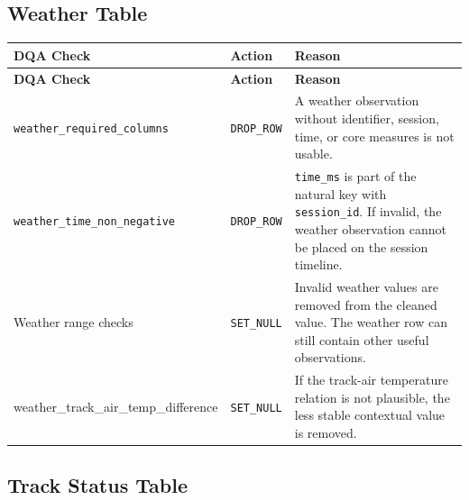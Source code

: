 \documentclass[a4paper,11pt]{article}
\begin{document}
	\subsection{Weather Table}
	
	\begin{longtable}{p{6cm}p{2.5cm}p{6.4cm}}
		\toprule
		\textbf{DQA Check} & \textbf{Action} & \textbf{Reason} \\
		\midrule
		\endfirsthead
		
		\toprule
		\textbf{DQA Check} & \textbf{Action} & \textbf{Reason} \\
		\midrule
		\endhead
		
		\texttt{weather\_required\_columns}
		& \texttt{DROP\_ROW}
		& A weather observation without identifier, session, time, or core measures is not usable. \\
		\midrule
		
		\texttt{weather\_time\_non\_negative}
		& \texttt{DROP\_ROW}
		& \texttt{time\_ms} is part of the natural key with \texttt{session\_id}. If invalid, the weather observation cannot be placed on the session timeline. \\
		\midrule
		
		Weather range checks
		& \texttt{SET\_NULL}
		& Invalid weather values are removed from the cleaned value. The weather row can still contain other useful observations. \\
		\midrule
		
		\small{weather\_track\_air\_temp\_difference}
		& \texttt{SET\_NULL}
		& If the track-air temperature relation is not plausible, the less stable contextual value is removed. \\
		\bottomrule
	\end{longtable}
	
	\subsection{Track Status Table}
	
\end{document}
